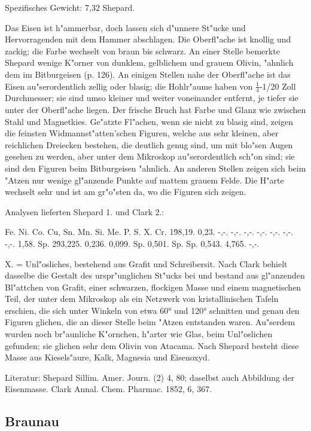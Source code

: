 \documentclass[a4paper, 11pt, oneside]{article}
\begin{document}
Spezifisches Gewicht: 7,32 Shepard.

Das Eisen ist h"ammerbar, doch lassen sich d"unnere St"ucke und Hervorragenden mit dem Hammer abschlagen. Die Oberfl"ache ist knollig und zackig; die Farbe wechselt von braun bis schwarz. An einer Stelle bemerkte Shepard wenige K"orner von dunklem, gelblichem und grauem Olivin, "ahnlich dem im Bitburgeisen (p. 126). An einigen Stellen nahe der Oberfl"ache ist das Eisen au"serordentlich zellig oder blasig; die Hohlr"aume haben von $\frac{1}{4}$-1/20 Zoll Durchmesser; sie sind umso kleiner und weiter voneinander entfernt, je tiefer sie unter der Oberfl"ache liegen. Der frische Bruch hat Farbe und Glanz wie zwischen Stahl und Magnetkies. Ge"atzte Fl"achen, wenn sie nicht zu blasig sind, zeigen die feinsten Widmannst"atten'schen Figuren, welche aus sehr kleinen, aber reichlichen Dreiecken bestehen, die deutlich genug sind, um mit blo"sen Augen gesehen zu werden, aber unter dem Mikroskop au"serordentlich sch"on sind; sie sind den Figuren beim Bitburgeisen "ahnlich. An anderen Stellen zeigen sich beim "Atzen nur wenige gl"anzende Punkte auf mattem grauem Felde. Die H"arte wechselt sehr und ist am gr"o"sten da, wo die Figuren sich zeigen.

Analysen lieferten Shepard 1. und Clark 2.:

Fe. Ni. Co. Cu, Sn. Mn. Si. Me. P. S. X. Cr.  
1\. 98,19. 0,23. -,-. -,-. -,-. -,-. -,-. -,-. -,-. 1,58. Sp.  
2\. 93,225. 0,236. 0,099. Sp. 0,501. Sp. Sp. 0,543. 4,765. -,-.

X. = Unl"osliches, bestehend aus Grafit und Schreibersit. Nach Clark behielt dasselbe die Gestalt des urspr"unglichen St"ucks bei und bestand aus gl"anzenden Bl"attchen von Grafit, einer schwarzen, flockigen Masse und einem magnetischen Teil, der unter dem Mikroskop als ein Netzwerk von kristallinischen Tafeln erschien, die sich unter Winkeln von etwa 60° und 120° schnitten und genau den Figuren glichen, die an dieser Stelle beim "Atzen entstanden waren. Au"serdem wurden noch br"aunliche K"ornchen, h"arter wie Glas, beim Unl"oslichen gefunden; sie glichen sehr dem Olivin von Atacama. Nach Shepard besteht diese Masse aus Kiesels"aure, Kalk, Magnesia und Eisenoxyd.

Literatur: Shepard Sillim. Amer. Journ. (2) 4, 80; daselbst auch Abbildung der Eisenmasse. Clark Annal. Chem. Pharmac. 1852, 6, 367.

\subsection{Braunau}
\normalsize
\end{document}
